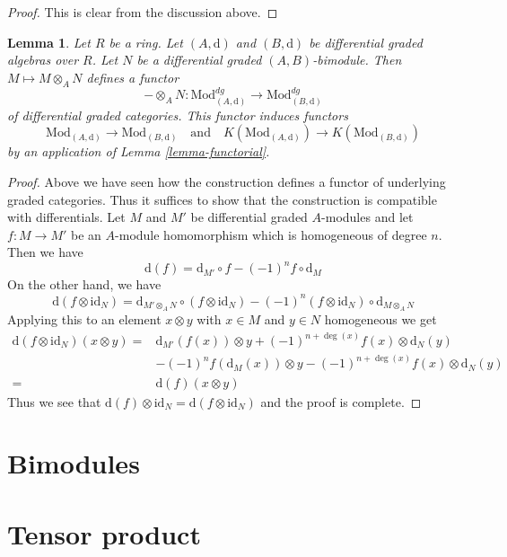 \documentclass{stacks-project}
\theoremstyle{plain}
\newtheorem{lemma}[subsection]{Lemma}
\theoremstyle{definition}
\theoremstyle{remark}
\numberwithin{equation}{subsection}
\begin{document}
\begin{proof}
This is clear from the discussion above.
\end{proof}

\begin{lemma}
\label{lemma-tensor}
Let $R$ be a ring. Let $(A, \text{d})$ and $(B, \text{d})$
be differential graded algebras over $R$. Let $N$ be a
differential graded $(A, B)$-bimodule. Then
$M \mapsto M \otimes_A N$ defines a functor
$$
- \otimes_A N :
\text{Mod}^{dg}_{(A, \text{d})}
\longrightarrow
\text{Mod}^{dg}_{(B, \text{d})}
$$
of differential graded categories. This functor induces functors
$$
\text{Mod}_{(A, \text{d})} \to \text{Mod}_{(B, \text{d})}
\quad\text{and}\quad
K(\text{Mod}_{(A, \text{d})}) \to K(\text{Mod}_{(B, \text{d})})
$$
by an application of Lemma \ref{lemma-functorial}.
\end{lemma}

\begin{proof}
Above we have seen how the construction defines a functor of underlying
graded categories. Thus it suffices to show that the construction is
compatible with differentials. Let $M$ and $M'$ be differential
graded $A$-modules and let $f : M \to M'$ be an $A$-module homomorphism
which is homogeneous of degree $n$. Then we have
$$
\text{d}(f) = \text{d}_{M'} \circ f - (-1)^n f \circ \text{d}_M
$$
On the other hand, we have
$$
\text{d}(f \otimes \text{id}_N) =
\text{d}_{M' \otimes_A N} \circ
(f \otimes \text{id}_N)
- (-1)^n
(f \otimes \text{id}_N) \circ \text{d}_{M \otimes_A N}
$$
Applying this to an element $x \otimes y$ with $x \in M$ and
$y \in N$ homogeneous we get
\begin{align*}
\text{d}(f \otimes \text{id}_N)(x \otimes y)
= &
\text{d}_{M'}(f(x)) \otimes y + (-1)^{n + \deg(x)}f(x) \otimes \text{d}_N(y) \\
& - (-1)^n f(\text{d}_M(x)) \otimes y
- (-1)^{n + \deg(x)}f(x) \otimes \text{d}_N(y) \\
= &
\text{d}(f) (x \otimes y)
\end{align*}
Thus we see that $\text{d}(f) \otimes \text{id}_N =
\text{d}(f \otimes \text{id}_N)$ and the proof is complete.
\end{proof}

\section{Bimodules}
\label{section-bimodules}

\section{Tensor product}
\label{section-tensor-product}
\end{document}
